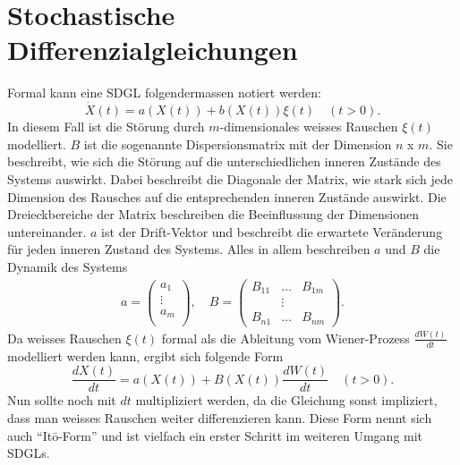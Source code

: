 %
%
%
%

\section{Stochastische Differenzialgleichungen\label{brown:SDGL}}

Formal kann eine SDGL folgendermassen notiert werden: 
\begin{equation}
	\label{brown:SDGL:whiteNoise}
	\dot{X}(t) = a(X(t)) + b(X(t))\xi(t) \quad (t>0).
\end{equation}
In diesem Fall ist die Störung durch $ m $-dimensionales weisses Rauschen $ \xi(t) $ modelliert. $ B $ ist die sogenannte Dispersionsmatrix mit der Dimension $ n $ x $ m $. Sie beschreibt, wie sich die Störung auf die unterschiedlichen inneren Zustände des Systems auswirkt. Dabei beschreibt die Diagonale der Matrix, wie stark sich jede Dimension des Rausches auf die entsprechenden inneren Zustände auswirkt. Die Dreieckbereiche der Matrix beschreiben die Beeinflussung der Dimensionen untereinander. $ a $ ist der Drift-Vektor und beschreibt die erwartete Veränderung für jeden inneren Zustand des Systems. Alles in allem beschreiben $ a $ und $ B $ die Dynamik des Systems
\begin{align*}
	a = 
	\begin{pmatrix}
		a_{1} \\
		\vdots \\
		a_{m}\\ 
	\end{pmatrix}
	, \quad
	B = 
	\begin{pmatrix}
		B_{11} & \dots & B_{1m} \\
		& \vdots & \\
		B_{n1} & \dots & B_{nm} 
	\end{pmatrix}.
\end{align*}
Da weisses Rauschen $ \xi(t) $ formal als die Ableitung vom Wiener-Prozess $ \frac{dW(t)}{dt} $ modelliert werden kann, ergibt sich folgende Form
\begin{equation}
	\frac{dX(t)}{dt} = a(X(t)) + B(X(t)) \frac{dW(t)}{dt} \quad (t>0).
\end{equation}
Nun sollte noch mit $ dt $  multipliziert werden, da die Gleichung sonst impliziert, dass man weisses Rauschen weiter differenzieren kann. Diese Form nennt sich auch ``Itō-Form'' und ist vielfach ein erster Schritt im weiteren Umgang mit SDGLs.
